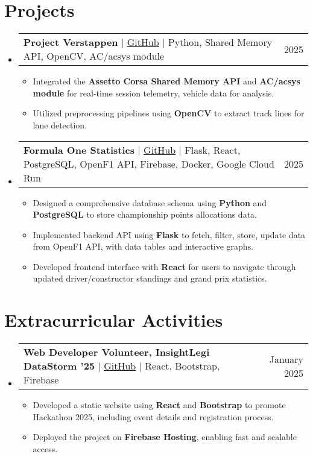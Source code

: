 \documentclass[letterpaper,11pt]{article}
\makeatletter
\newcommand{\resumeItem}[1]{
  \item\small{
    {#1 \vspace{-3pt}}
  }
}
\newcommand{\resumeProjectHeading}[2]{
    \item
    \begin{tabular*}{0.97\textwidth}{l@{\extracolsep{\fill}}r@{\hspace{-0.2in}}}
        \small#1 & \small#2 \\
    \end{tabular*}\vspace{-7pt}
}
\newcommand{\resumeSubHeadingListStart}{\begin{itemize}[leftmargin=0.00in, rightmargin=-0.2in, label={}]}
\newcommand{\resumeSubHeadingListEnd}{\end{itemize}\vspace{-7pt}}
\newcommand{\resumeItemListStart}{\begin{itemize}[leftmargin=0.15in, rightmargin=0.15in]}
\newcommand{\resumeItemListEnd}{\end{itemize}\vspace{-7pt}}
\makeatother
\begin{document}

\section{Projects}
\resumeSubHeadingListStart

\resumeProjectHeading
{\textbf{Project Verstappen} $|$ \href{https://github.com/juhun32/project-verstappen}{\underline{GitHub}} $|$ Python, Shared Memory API, OpenCV, AC/acsys module}{2025}
\resumeItemListStart
\resumeItem{Integrated the \textbf{Assetto Corsa Shared Memory API} and \textbf{AC/acsys module} for real-time session telemetry, vehicle data for analysis.}
\resumeItem{Utilized preprocessing pipelines using \textbf{OpenCV} to extract track lines for lane detection.}
\resumeItemListEnd

\resumeProjectHeading
{\textbf{Formula One Statistics} $|$ \href{https://github.com/juhun32/f1-statistics}{\underline{GitHub}} $|$ Flask, React, PostgreSQL, OpenF1 API, Firebase, Docker, Google Cloud Run}{2025}
\resumeItemListStart
\resumeItem{Designed a comprehensive database schema using \textbf{Python} and \textbf{PostgreSQL} to store championship points allocations data.}
\resumeItem{Implemented backend API using \textbf{Flask} to fetch, filter, store, update data from OpenF1 API, with data tables and interactive graphs.}
\resumeItem{Developed frontend interface with \textbf{React} for users to navigate through updated driver/constructor standings and grand prix statistics.}
\resumeItemListEnd


\resumeSubHeadingListEnd


\section{Extracurricular Activities}
\resumeSubHeadingListStart
\resumeProjectHeading
{\textbf{Web Developer Volunteer, InsightLegi DataStorm '25} $|$ \href{https://github.com/juhun32/datastorm25}{\underline{GitHub}} $|$ React, Bootstrap, Firebase}{January 2025}
\resumeItemListStart
\resumeItem{Developed a static website using \textbf{React} and \textbf{Bootstrap} to promote Hackathon 2025, including event details and registration process.}
\resumeItem{Deployed the project on \textbf{Firebase Hosting}, enabling fast and scalable access.}
\resumeItemListEnd
\resumeSubHeadingListEnd
\end{document}
